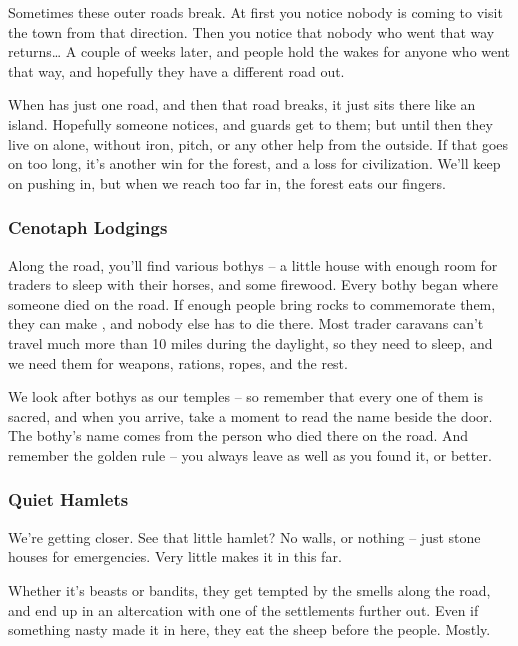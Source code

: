 \begin{multicols}{2}
\begin{exampletext}
  Sometimes these outer roads break.
  At first you notice nobody is coming to visit the town from that direction.
  Then you notice that nobody who went that way returns\ldots
  A couple of weeks later, and people hold the wakes for anyone who went that way, and hopefully they have a different road out.

  When  has just one road, and then that road breaks, it just sits there like an island.
  Hopefully someone notices, and \glspl{guard} get to them; but until then they live on alone, without iron, pitch, or any other help from the outside.
  If that goes on too long, it's another win for the forest, and a loss for civilization.
  We'll keep on pushing in, but when we reach too far in, the forest eats our fingers.

  \subsubsection*{Cenotaph Lodgings}

  Along the road, you'll find various \glspl{bothy} -- a little house with enough room for traders to sleep with their horses, and some firewood.
  Every \gls{bothy} began where someone died on the road.
  If enough people bring rocks to commemorate them, they can make , and nobody else has to die there.
  Most trader caravans can't travel much more than 10 miles during the daylight, so they need  to sleep, and we need them for weapons, rations, ropes, and the rest.

  We look after \glspl{bothy} as our temples -- so remember that every one of them is sacred, and when you arrive, take a moment to read the name beside the door.
  The \gls{bothy}'s name comes from the person who died there on the road.
  And remember the golden rule -- you always leave  as well as you found it, or better.

  \subsubsection*{Quiet Hamlets}

  We're getting closer.
  See that little hamlet?
  No walls, or nothing -- just stone houses for emergencies.
  Very little makes it in this far.

  Whether it's beasts or bandits, they get tempted by the smells along the road, and end up in an altercation with one of the settlements further out.
  Even if something nasty made it in here, they eat the sheep before the people.
  Mostly.


\end{exampletext}
\end{multicols}
